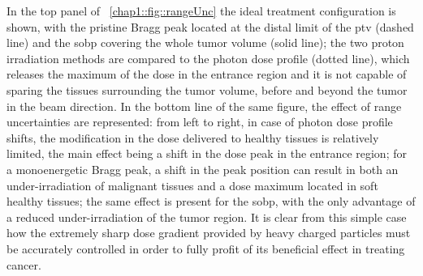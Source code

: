 In the top panel of \figurename~\ref{chap1::fig::rangeUnc} the ideal treatment configuration is shown, with the pristine Bragg peak located at the distal limit of the \gls{ptv} (dashed line) and the \gls{sobp} covering the whole tumor volume (solid line); the two proton irradiation methods are compared to the photon dose profile (dotted line), which releases the maximum of the dose in the entrance region and it is not capable of sparing the tissues surrounding the tumor volume, before and beyond the tumor in the beam direction. In the bottom line of the same figure, the effect of range uncertainties are represented: from left to right, in case of photon dose profile shifts, the modification in the dose delivered to healthy tissues is relatively limited, the main effect being a shift in the dose peak in the entrance region; for a monoenergetic Bragg peak, a shift in the peak position can result in both an under-irradiation of malignant tissues and a dose maximum located in soft healthy tissues; the same effect is present for the \gls{sobp}, with the only advantage of a reduced under-irradiation of the tumor region. It is clear from this simple case how the extremely sharp dose gradient provided by heavy charged particles must be accurately controlled in order to fully profit of its beneficial effect in treating cancer. 
